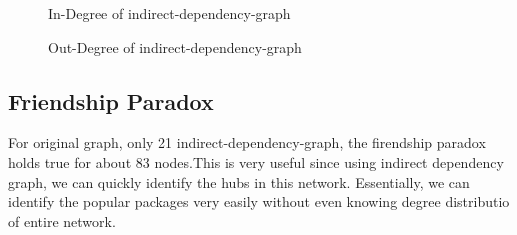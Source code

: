 \begin{figure}[indegree]
\centering
{}
\caption{In-Degree of indirect-dependency-graph}
\label{fig:indegree}
\end{figure}

\begin{figure}[outdegree]
\centering
{}
\caption{Out-Degree of indirect-dependency-graph}
\label{fig:outdegree}
\end{figure}


\subsection{Friendship Paradox} \label{friend}
For original graph, only 21%
indirect-dependency-graph, the firendship paradox holds true for about 83%
nodes.This is very useful since using indirect dependency graph, we can
quickly identify the hubs in this network. Essentially, we can identify the
popular packages very easily without even knowing degree distributio of
entire network.


